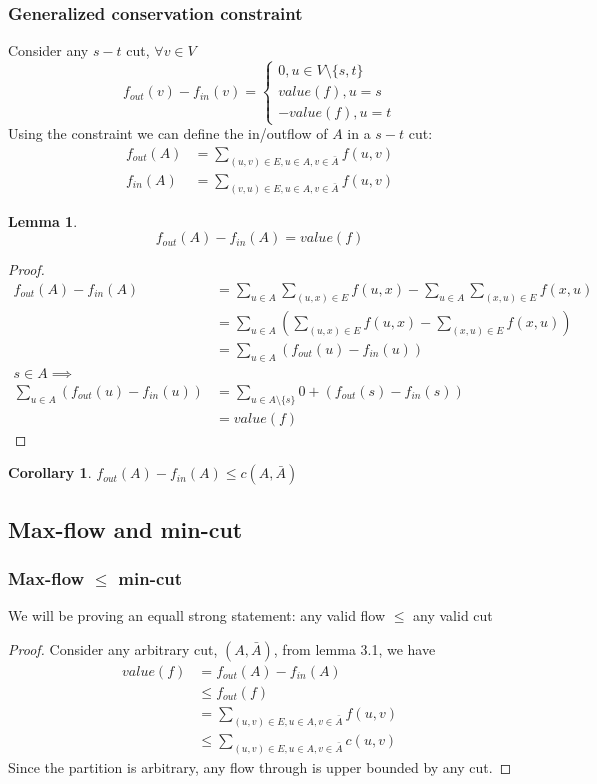 \documentclass[10pt]{article}
\theoremstyle{definition}
\newtheorem{lemma}[definition]{Lemma}
\newtheorem{corollary}[definition]{Corollary}
\begin{document}
\subsubsection*{Generalized conservation constraint}
Consider any $s-t$ cut, $\forall v\in V$ 
\[f_{out}(v) - f_{in}(v) = \begin{cases}
    0, u \in V \setminus \{s, t\}\\
    value(f), u = s\\
    -value(f), u = t
\end{cases}\]
Using the constraint we can define the in/outflow of $A$ in a $s-t$ cut:
\begin{align*}
  f_{out}(A) &= \sum_{(u, v) \in E, u \in A, v \in \bar{A}} f(u, v)\\
  f_{in}(A) &= \sum_{(v, u) \in E, u \in A, v \in \bar{A}} f(u, v)
\end{align*}
\begin{lemma}
  \[f_{out}(A) - f_{in}(A) = value(f)\]
\end{lemma}
\begin{proof}
  \begin{align*}
    f_{out}(A) - f_{in}(A)&= \sum_{u \in A} \sum_{(u, x) \in E} f(u, x) - \sum_{u \in A} \sum_{(x, u)\in E} f(x, u)\\
    &=\sum_{u\in A}\left( \sum_{(u, x) \in E} f(u, x) - \sum_{(x, u) \in E} f(x, u)\right)\\
    &= \sum_{u\in A} \left( f_{out}(u) - f_{in}(u) \right)\\
    s\in A \implies \\
    \sum_{u\in A} \left( f_{out}(u) - f_{in}(u) \right) &= \sum_{u \in A \setminus \{s\}} 0 + (f_{out}(s) - f_{in}(s))\\
    &= value(f)
  \end{align*}
\end{proof}
\begin{corollary}
  $f_{out}(A) - f_{in}(A) \leq c(A, \bar{A})$
\end{corollary}
\subsection{Max-flow and min-cut}
\subsubsection*{Max-flow $\leq$ min-cut}
We will be proving an equall strong statement: any valid flow $\leq$ any valid cut
\begin{proof}
  Consider any arbitrary cut, $(A, \bar{A})$, 
  from lemma 3.1, we have 
  \begin{align*}
  value(f) &= f_{out}(A) - f_{in}(A)\\    
  &\leq f_{out}(f)\\
  &= \sum_{(u,v) \in E, u \in A, v\in \bar{A}} f(u, v)\\
  &\leq \sum_{(u,v) \in E, u \in A, v\in \bar{A}} c(u, v)
  \end{align*}
  Since the partition is arbitrary, any flow through is upper bounded by any cut.
\end{proof}
\end{document}
